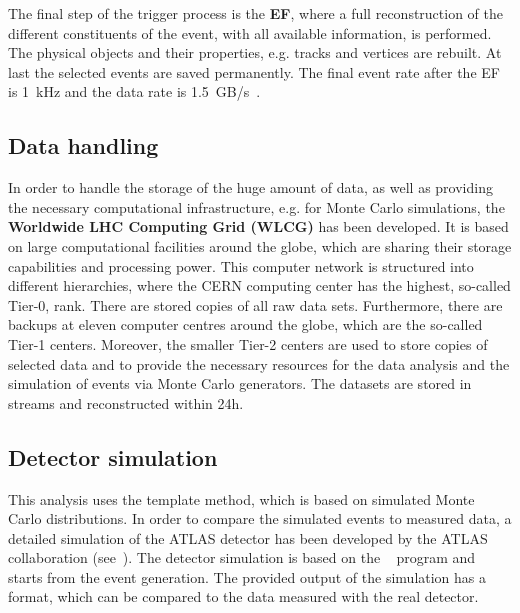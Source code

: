  The final step of the trigger process is the \textbf{EF}, where a full reconstruction of the different constituents of the event, with all available information, is performed. The physical objects and their properties, e.g.  tracks and vertices are rebuilt. At last the selected events are saved permanently. The final event rate after the EF is 1~kHz and the data rate is 1.5~GB/s~\cite{Nakahama:2015211}.






\subsection{Data handling}

 In order to handle the storage of the huge amount of data, as well as providing the necessary computational infrastructure, e.g. for Monte Carlo simulations, the\textbf{ Worldwide LHC Computing Grid (WLCG)} has been developed. It is based on large computational facilities around the globe, which are sharing their storage capabilities and processing power. This computer network is structured into different hierarchies, where the CERN computing center has the highest, so-called  Tier-0,  rank. There are stored copies of all raw data sets. Furthermore, there are backups at eleven computer centres around the globe, which are the so-called Tier-1 centers. Moreover,  the smaller Tier-2 centers are used to store copies of selected data and to provide the necessary resources for the data analysis and the simulation of events via Monte Carlo generators. The datasets are stored in streams and reconstructed within 24h.


\subsection{Detector simulation}
This analysis uses the template method, which is based on simulated Monte Carlo distributions. In order to compare the simulated events to measured data, a detailed simulation of the ATLAS detector has been developed by the ATLAS collaboration (see~\cite{Aad:2010ah}). 
The detector simulation is based on the ~\cite{Agostinelli:2002hh} program  and starts from the event generation. The provided output of the simulation has a format, which can be compared to the data measured with the real detector.  


